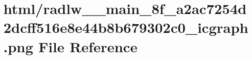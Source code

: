 \hypertarget{radlw____main__8f__a2ac7254d2dcff516e8e44b8b679302c0__icgraph_8png}{}\section{html/radlw\+\_\+\+\_\+main\+\_\+8f\+\_\+a2ac7254d2dcff516e8e44b8b679302c0\+\_\+icgraph.png File Reference}
\label{radlw____main__8f__a2ac7254d2dcff516e8e44b8b679302c0__icgraph_8png}
